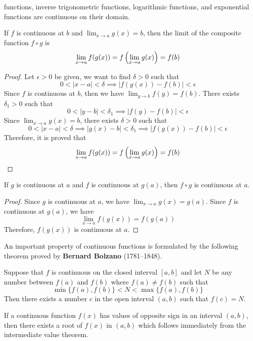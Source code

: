 functions, inverse trigonometric functions, logarithmic functions, and
exponential functions are continuous on their domain.
\begin{theorem}
    If \(f\) is continuous at \(b\) and \(\lim_{x\to a}g(x)=b\), then
    the limit of the composite function \(f\circ g\) is
    \[\lim_{x\to a}f(g(x))=f\left(\lim_{x\to a}g(x)\right)=f(b)\qedhere\]
\end{theorem}
\begin{proof}
    Let \(\epsilon>0\) be given, we want to find \(\delta>0\) such that
    \[0<|x-a|<\delta\implies|f(g(x))-f(b)|<\epsilon\]
    Since \(f\) is continuous at \(b\), then we have \(\lim_{y\to b}f(y)=f(b)\).
    There exists \(\delta_1>0\) such that
    \[0<|y-b|<\delta_1\implies|f(y)-f(b)|<\epsilon\]
    Since \(\lim_{x\to a}g(x)=b\), there exists \(\delta>0\) such that
    \[0<|x-a|<\delta\implies|g(x)-b|<\delta_1\implies|f(g(x))-f(b)|<\epsilon\]
    Therefore, it is proved that
    \[\lim_{x\to a}f(g(x))=f\left(\lim_{x\to a}g(x)\right)=f(b)\qedhere\]
\end{proof}
\begin{theorem}
    If \(g\) is continuous at \(a\) and \(f\) is continuous at \(g(a)\), then
    \(f\circ g\) is continuous at \(a\).
\end{theorem}
\begin{proof}
    Since \(g\) is continuous at \(a\), we have \(\lim_{x\to a}g(x)=g(a)\).
    Since \(f\) is continuous at \(g(a)\), we have
    \[\lim_{x\to a}f(g(x))=f(g(a))\]
    Therefore, \(f(g(x))\) is continuous at \(a\).
\end{proof}
An important property of continuous functions is formulated by the following
theorem proved by \textbf{Bernard Bolzano} (1781--1848).
\begin{theorem}
    Suppose that \(f\) is continuous on the closed interval \([a,b]\) and let
    \(N\) be any number between \(f(a)\) and \(f(b)\) where \(f(a)\neq f(b)\)
    such that \[\min\{f(a),f(b)\}<N<\max\{f(a),f(b)\}\]
    Then there exists a number \(c\) in the open interval \((a,b)\) such that
    \(f(c)=N\).
\end{theorem}
If a continuous function \(f(x)\) has values of opposite sign in an interval
\((a,b)\), then there exists a root of \(f(x)\) in \((a,b)\) which follows immediately from
the intermediate value theorem.